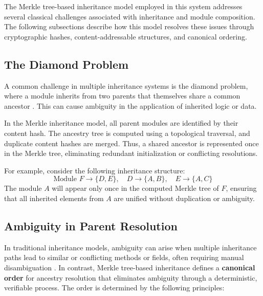 \documentclass[sigplan,screen]{acmart}
\begin{document}
The Merkle tree-based inheritance model employed in this system addresses several classical challenges associated with inheritance and module composition. The following subsections describe how this model resolves these issues through cryptographic hashes, content-add\-ressable structures, and canonical ordering.

\subsection{The Diamond Problem}

A common challenge in multiple inheritance systems is the diamond problem, where a module inherits from two parents that themselves share a common ancestor \cite{snyder1986}. This can cause ambiguity in the application of inherited logic or data.

In the Merkle inheritance model, all parent modules are identified by their content hash. The ancestry tree is computed using a topological traversal, and duplicate content hashes are merged. Thus, a shared ancestor is represented once in the Merkle tree, eliminating redundant initialization or conflicting resolutions.

For example, consider the following inheritance structure:
\[
\text{Module } F \rightarrow \{D, E\}, \quad D \rightarrow \{A, B\}, \quad E \rightarrow \{A, C\}
\]
The module $A$ will appear only once in the computed Merkle tree of $F$, ensuring that all inherited elements from $A$ are unified without duplication or ambiguity.

\subsection{Ambiguity in Parent Resolution}

In traditional inheritance models, ambiguity can arise when multiple inheritance paths lead to similar or conflicting methods or fields, often requiring manual disambiguation \cite{python_mro}. In contrast, Merkle tree-based inheritance defines a \textbf{canonical order} for ancestry resolution that eliminates ambiguity through a deterministic, verifiable process. The order is determined by the following principles:
\end{document}
